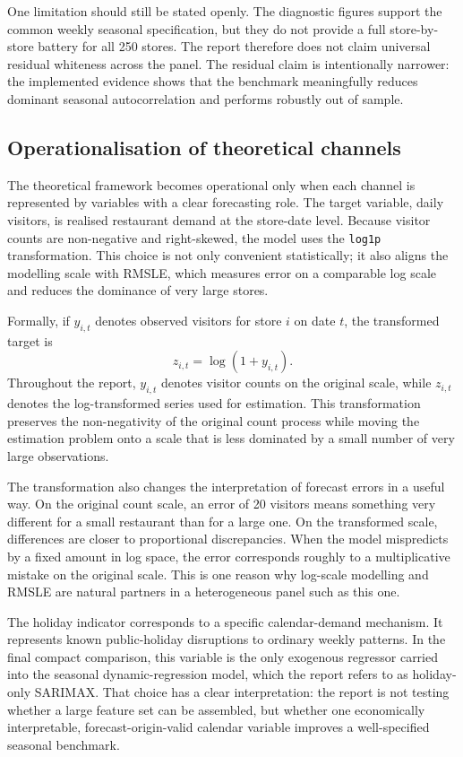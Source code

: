 \documentclass[11pt,oneside]{scrartcl}
\begin{document}
One limitation should still be stated openly. The diagnostic figures support the common weekly seasonal specification, but they do not provide a full store-by-store battery for all 250 stores. The report therefore does not claim universal residual whiteness across the panel. The residual claim is intentionally narrower: the implemented evidence shows that the benchmark meaningfully reduces dominant seasonal autocorrelation and performs robustly out of sample.

\subsection{Operationalisation of theoretical channels}
The theoretical framework becomes operational only when each channel is represented by variables with a clear forecasting role. The target variable, daily visitors, is realised restaurant demand at the store-date level. Because visitor counts are non-negative and right-skewed, the model uses the \texttt{log1p} transformation. This choice is not only convenient statistically; it also aligns the modelling scale with RMSLE, which measures error on a comparable log scale and reduces the dominance of very large stores.

Formally, if $y_{i,t}$ denotes observed visitors for store $i$ on date $t$, the transformed target is
\[
z_{i,t} = \log(1+y_{i,t}).
\]
Throughout the report, $y_{i,t}$ denotes visitor counts on the original scale, while $z_{i,t}$ denotes the log-transformed series used for estimation. This transformation preserves the non-negativity of the original count process while moving the estimation problem onto a scale that is less dominated by a small number of very large observations.

The transformation also changes the interpretation of forecast errors in a useful way. On the original count scale, an error of 20 visitors means something very different for a small restaurant than for a large one. On the transformed scale, differences are closer to proportional discrepancies. When the model mispredicts by a fixed amount in log space, the error corresponds roughly to a multiplicative mistake on the original scale. This is one reason why log-scale modelling and RMSLE are natural partners in a heterogeneous panel such as this one.

The holiday indicator corresponds to a specific calendar-demand mechanism. It represents known public-holiday disruptions to ordinary weekly patterns. In the final compact comparison, this variable is the only exogenous regressor carried into the seasonal dynamic-regression model, which the report refers to as holiday-only SARIMAX. That choice has a clear interpretation: the report is not testing whether a large feature set can be assembled, but whether one economically interpretable, forecast-origin-valid calendar variable improves a well-specified seasonal benchmark.
\end{document}
